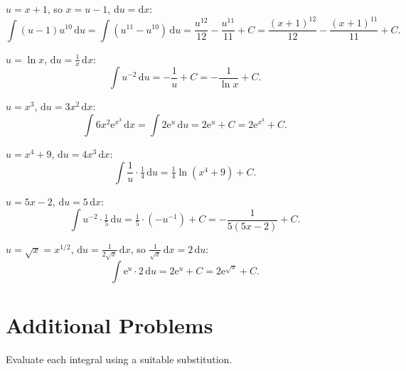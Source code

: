 \begin{solutions}
  \item $u=x+1$, so $x=u-1$, $\mathrm{d}u=\mathrm{d}x$:
        \[
          \int (u-1)u^{10}\,\mathrm{d}u
            =\int (u^{11}-u^{10})\,\mathrm{d}u
            =\frac{u^{12}}{12}-\frac{u^{11}}{11}+C
            =\frac{(x+1)^{12}}{12}-\frac{(x+1)^{11}}{11}+C .
        \]

  \item $u=\ln x$, $\mathrm{d}u=\tfrac1x\,\mathrm{d}x$:
        \[
          \int u^{-2}\,\mathrm{d}u=-\frac1u+C=-\frac{1}{\ln x}+C .
        \]

  \item $u=x^{3}$, $\mathrm{d}u=3x^{2}\,\mathrm{d}x$:
        \[
          \int 6x^{2}\mathrm{e}^{x^{3}}\,\mathrm{d}x
            =\int 2\mathrm{e}^{u}\,\mathrm{d}u
            =2\mathrm{e}^{u}+C=2\mathrm{e}^{x^{3}}+C .
        \]

  \item $u=x^{4}+9$, $\mathrm{d}u=4x^{3}\,\mathrm{d}x$:
        \[
          \int \frac1u\cdot\tfrac14\,\mathrm{d}u
            =\tfrac14\ln(x^{4}+9)+C .
        \]

  \item $u=5x-2$, $\mathrm{d}u=5\,\mathrm{d}x$:
        \[
          \int u^{-2}\cdot\tfrac15\,\mathrm{d}u
            =\tfrac15\cdot(-u^{-1})+C=-\frac{1}{5(5x-2)}+C .
        \]

  \item $u=\sqrt{x}=x^{1/2}$, $\mathrm{d}u=\tfrac{1}{2\sqrt{x}}\,\mathrm{d}x$,
        so $\tfrac{1}{\sqrt{x}}\,\mathrm{d}x=2\,\mathrm{d}u$:
        \[
          \int \mathrm{e}^{u}\cdot 2\,\mathrm{d}u
            =2\mathrm{e}^{u}+C=2\mathrm{e}^{\sqrt{x}}+C .
        \]
\end{solutions}

\section{Additional Problems}

Evaluate each integral using a suitable substitution.

